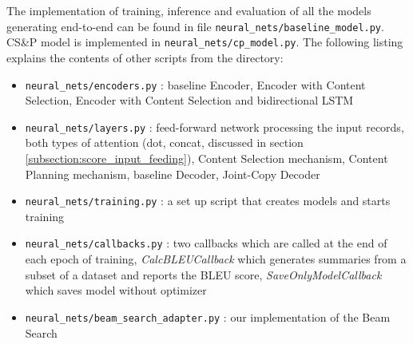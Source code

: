 The implementation of training, inference and evaluation of all the models generating end-to-end can be found in file \texttt{neural\_nets/baseline\_model.py}. CS\&P model is implemented in \texttt{neural\_nets/cp\_model.py}. The following listing explains the contents of other scripts from the directory:
\begin{itemize}
    \item \texttt{neural\_nets/encoders.py} : baseline Encoder, Encoder with Content Selection, Encoder with Content Selection and bidirectional LSTM
    \item \texttt{neural\_nets/layers.py} : feed-forward network processing the input re\-cords, both types of attention (dot, concat, discussed in section \ref{subsection:score_input_feeding}), Content Selection mechanism, Content Planning mechanism, baseline Decoder, Joint-Copy Decoder
    \item \texttt{neural\_nets/training.py} : a set up script that creates models and starts training
    \item \texttt{neural\_nets/callbacks.py} : two callbacks which are called at the end of each epoch of training, \emph{CalcBLEUCallback} which generates summaries from a subset of a dataset and reports the BLEU score, \emph{SaveOnlyModelCallback} which saves model without optimizer
    \item \texttt{neural\_nets/beam\_search\_adapter.py} : our implementation of the Beam \linebreak Search
\end{itemize}

